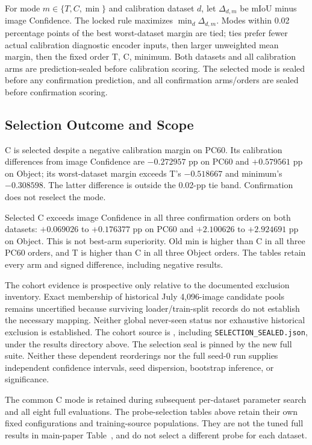 For mode $m\in\{T,C,\min\}$ and calibration dataset $d$, let $\Delta_{d,m}$ be mIoU minus image Confidence. The locked rule maximizes $\min_d\Delta_{d,m}$. Modes within 0.02 percentage points of the best worst-dataset margin are tied; ties prefer fewer actual calibration diagnostic encoder inputs, then larger unweighted mean margin, then the fixed order T, C, minimum. Both datasets and all calibration arms are prediction-sealed before calibration scoring. The selected mode is sealed before any confirmation prediction, and all confirmation arms/orders are sealed before confirmation scoring.

\subsection{Selection Outcome and Scope}
C is selected despite a negative calibration margin on PC60. Its calibration differences from image Confidence are $-0.272957$ pp on PC60 and $+0.579561$ pp on Object; its worst-dataset margin exceeds T's $-0.518667$ and minimum's $-0.308598$. The latter difference is outside the 0.02-pp tie band. Confirmation does not reselect the mode.



Selected C exceeds image Confidence in all three confirmation orders on both datasets: $+0.069026$ to $+0.176377$ pp on PC60 and $+2.100626$ to $+2.924691$ pp on Object. This is not best-arm superiority. Old min is higher than C in all three PC60 orders, and T is higher than C in all three Object orders. The tables retain every arm and signed difference, including negative results.

The cohort evidence is prospective only relative to the documented exclusion inventory. Exact membership of historical July 4,096-image candidate pools remains uncertified because surviving loader/train-split records do not establish the necessary mapping. Neither global never-seen status nor exhaustive historical exclusion is established. The cohort source is , including \texttt{SELECTION\_SEALED.json}, under the results directory above. The selection seal is pinned by the new full suite. Neither these dependent reorderings nor the full seed-0 run supplies independent confidence intervals, seed dispersion, bootstrap inference, or significance.

The common C mode is retained during subsequent per-dataset parameter search and all eight full evaluations. The probe-selection tables above retain their own fixed configurations and training-source populations. They are not the tuned full results in main-paper Table~, and do not select a different probe for each dataset.

